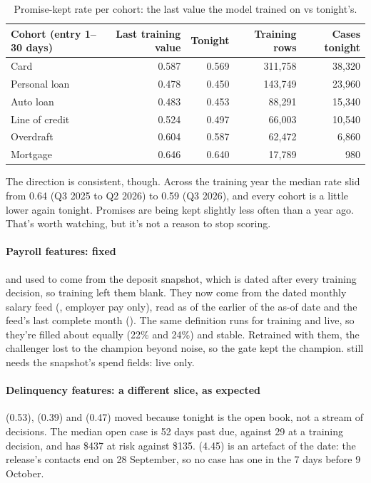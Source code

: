 \documentclass[11pt]{article}
\begin{document}
\begin{table}[H]\small\centering
\begin{tabular}{@{}lrrrr@{}}
\toprule
\textbf{Cohort (entry 1–30 days)} & \textbf{Last training value} & \textbf{Tonight} & \textbf{Training rows} & \textbf{Cases tonight} \\
\midrule
Card & 0.587 & 0.569 & 311,758 & 38,320 \\
Personal loan & 0.478 & 0.450 & 143,749 & 23,960 \\
Auto loan & 0.483 & 0.453 & 88,291 & 15,340 \\
Line of credit & 0.524 & 0.497 & 66,003 & 10,540 \\
Overdraft & 0.604 & 0.587 & 62,472 & 6,860 \\
Mortgage & 0.646 & 0.640 & 17,789 & 980 \\
\bottomrule
\end{tabular}
\caption{Promise-kept rate per cohort: the last value the model trained on vs tonight's.}
\end{table}

The direction is consistent, though. Across the training year the median rate slid from 0.64 (Q3 2025 to Q2 2026) to 0.59 (Q3 2026),
and every cohort is a little lower again tonight. Promises are being kept slightly less often than a year ago. That's
worth watching, but it's not a reason to stop scoring.

\paragraph{Payroll features: fixed}  and  used to come from the
deposit snapshot, which is dated after every training decision, so training left them blank. They now come from the dated
monthly salary feed (, employer pay only), read as of the earlier of the as-of date and the feed's
last complete month (). The same definition runs for training and live, so
they're filled about equally (22\% and 24\%) and stable. Retrained with them, the challenger lost to the champion beyond noise,
so the gate kept the champion.  still needs the snapshot's spend fields: live only.

\paragraph{Delinquency features: a different slice, as expected}  (0.53),  (0.39) and
 (0.47) moved because tonight is the open book, not a stream of decisions. The median open case is 52 days
past due, against 29 at a training decision, and has \$437 at risk against \$135.  (4.45) is an
artefact of the date: the release's contacts end on 28 September, so no case has one in the 7 days before 9 October.
\end{document}
